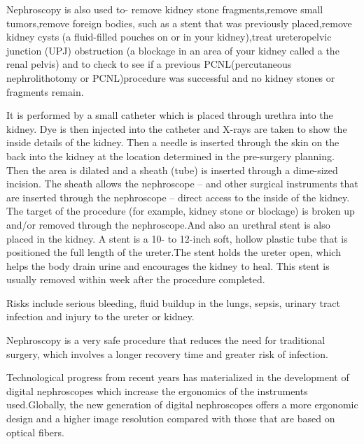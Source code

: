 \documentclass[12pt,A4paper]{article}
\begin{document}
Nephroscopy is also used to- remove kidney stone fragments,remove small tumors,remove foreign bodies, such as a stent that was previously placed,remove kidney cysts (a fluid-filled pouches on or in your kidney),treat ureteropelvic junction (UPJ) obstruction (a blockage in an area of your kidney called a the renal pelvis) and to check to see if a previous PCNL(percutaneous nephrolithotomy or PCNL)procedure was successful and no kidney stones or fragments remain.

It is performed by a small catheter which is placed through urethra into the kidney. Dye is then injected into the catheter and X-rays are taken to show the inside details of the kidney. Then a needle is inserted through the skin on the back into the kidney at the location determined in the pre-surgery planning. Then the area is dilated and a sheath (tube) is inserted through a dime-sized incision. The sheath allows the nephroscope – and other surgical instruments that are inserted through the nephroscope – direct access to the inside of the kidney. The target of the procedure (for example, kidney stone or blockage) is broken up and/or removed through the nephroscope.And also an urethral stent is also placed in the kidney. A stent is a 10- to 12-inch soft, hollow plastic tube that is positioned the full length of the ureter.The stent holds the ureter open, which helps the body drain urine and encourages the kidney to heal. This stent is usually removed within week after the procedure completed.

Risks include serious bleeding, fluid buildup in the lungs, sepsis, urinary tract infection and injury to the ureter or kidney.

Nephroscopy is a very safe procedure that reduces the need for traditional surgery, which involves a longer recovery time and greater risk of infection.

Technological progress from recent years has materialized in the development of digital nephroscopes which increase the ergonomics of the instruments used.Globally, the new generation of digital nephroscopes offers a more ergonomic design and a higher image resolution compared with those that are based on optical fibers.

\newpage
\end{document}
